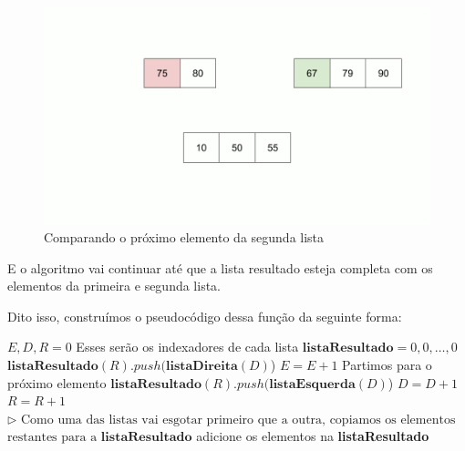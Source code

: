 \begin{figure}[!ht]
	\centering
	\includegraphics[scale=0.3]{figures/merge/merge-function-11.png}
	\caption{Comparando o próximo elemento da segunda lista}
\end{figure}

\FloatBarrier

E o algoritmo vai continuar até que a lista resultado esteja completa com os elementos da primeira e segunda lista.

Dito isso, construímos o pseudocódigo dessa função da seguinte forma:

\begin{algorithm}
	\label{algo:merge_aux_pseudo}
	\begin{algorithmic}[1]
		\Statex
		\State $E, D, R = 0$ \Comment Esses serão os indexadores de cada lista
		\State $\mathbf{listaResultado} = 0, 0,\ldots, 0$
		\State $\mathbf{listaResultado}(R).push(\mathbf{listaDireita}(D)$)
		\State $E = E + 1$ \Comment Partimos para o próximo elemento
		\Else
		\State $\mathbf{listaResultado}(R).push(\mathbf{listaEsquerda}(D)$)
		\State $D = D + 1$
		\EndIf
		\State $R = R + 1$
		\EndWhile
		\State $\rhd \text{ Como uma das listas vai esgotar primeiro que a outra, copiamos os elementos}$
		\State $\text{restantes para a }\mathbf{listaResultado}$
		\State adicione os elementos na \textbf{listaResultado}
		\EndWhile
		\EndFunction
	\end{algorithmic}
\end{algorithm}

